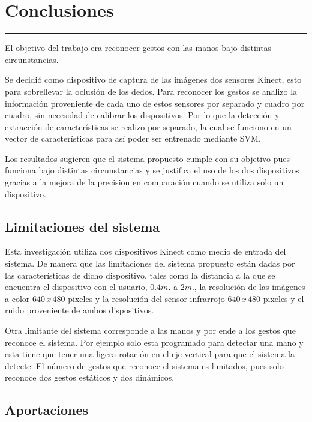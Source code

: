 \chapter{Conclusiones}\label{capit:cap6}
\vspace{-2.0325ex}%
\noindent
\rule{\textwidth}{0.5pt}
\vspace{-5.5ex}%
\newcommand{\pushline}{\Indp}%

El objetivo del trabajo era reconocer gestos con las manos bajo distintas circunstancias. 

Se decidió como dispositivo de captura de las imágenes dos sensores Kinect, esto para sobrellevar la oclusión de los dedos. Para reconocer los gestos se analizo la información proveniente de cada uno de estos sensores por separado y cuadro por cuadro, sin necesidad de calibrar los dispositivos.  Por lo que la detección y extracción de características se realizo por separado, la cual se funciono en un vector de características para así poder ser entrenado mediante SVM. 

Los resultados sugieren que el sistema propuesto cumple con su objetivo pues funciona bajo distintas circunstancias y se justifica el uso de los dos dispositivos gracias a la mejora de la precision en comparación cuando se utiliza solo un dispositivo.


\section{Limitaciones del sistema}

Esta investigación utiliza dos dispositivos Kinect como medio de entrada del sistema. De  manera que las limitaciones del sistema propuesto están dadas por las características de dicho dispositivo, tales como la distancia a la que se encuentra el dispositivo con el usuario, $0.4m.$ a $2m.$, la resolución de las imágenes a color $640 \, x \, 480$ pixeles y la resolución del sensor infrarrojo $640 \, x \, 480$ pixeles y el ruido proveniente de ambos dispositivos.

Otra limitante del sistema corresponde a las manos y por ende a los gestos que reconoce el sistema. Por ejemplo solo esta programado para detectar una mano y esta tiene que tener una ligera rotación en el eje vertical para que el sistema la detecte. El número de gestos que reconoce el sistema es limitados, pues solo reconoce dos gestos estáticos y dos dinámicos. 


\section{Aportaciones}  

